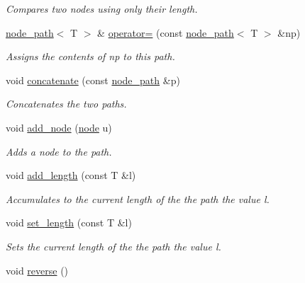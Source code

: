 \begin{DoxyCompactItemize}
\begin{DoxyCompactList}\small\item\em Compares two nodes using only their length. \end{DoxyCompactList}\item 
\hypertarget{classlgraph_1_1node__path_a36b5a71ed3dd72269e7eca72ed12dfcc}{\hyperlink{classlgraph_1_1node__path}{node\-\_\-path}$<$ T $>$ \& \hyperlink{classlgraph_1_1node__path_a36b5a71ed3dd72269e7eca72ed12dfcc}{operator=} (const \hyperlink{classlgraph_1_1node__path}{node\-\_\-path}$<$ T $>$ \&np)}\label{classlgraph_1_1node__path_a36b5a71ed3dd72269e7eca72ed12dfcc}

\begin{DoxyCompactList}\small\item\em Assigns the contents of {\itshape np} to this path. \end{DoxyCompactList}\item 
void \hyperlink{classlgraph_1_1node__path_a574b282afe2e987afeb4433addebe48e}{concatenate} (const \hyperlink{classlgraph_1_1node__path}{node\-\_\-path} \&p)
\begin{DoxyCompactList}\small\item\em Concatenates the two paths. \end{DoxyCompactList}\item 
void \hyperlink{classlgraph_1_1node__path_a273833cfc024fdfbd7ab69002a387f14}{add\-\_\-node} (\hyperlink{namespacelgraph_a397169dd66adf725210a30fb7251773e}{node} u)
\begin{DoxyCompactList}\small\item\em Adds a node to the path. \end{DoxyCompactList}\item 
void \hyperlink{classlgraph_1_1node__path_a65d2c02853fde5e1c004b74d2caf86e0}{add\-\_\-length} (const T \&l)
\begin{DoxyCompactList}\small\item\em Accumulates to the current length of the the path the value l. \end{DoxyCompactList}\item 
void \hyperlink{classlgraph_1_1node__path_a3fc92cd79059820c0206435d8546b90c}{set\-\_\-length} (const T \&l)
\begin{DoxyCompactList}\small\item\em Sets the current length of the the path the value l. \end{DoxyCompactList}\item 
\hypertarget{classlgraph_1_1node__path_a0a0b6d96c810c0b0b39d4e54661e4dcf}{void \hyperlink{classlgraph_1_1node__path_a0a0b6d96c810c0b0b39d4e54661e4dcf}{reverse} ()}\label{classlgraph_1_1node__path_a0a0b6d96c810c0b0b39d4e54661e4dcf}


\end{DoxyCompactItemize}
